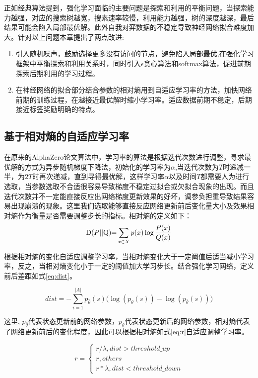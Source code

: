 正如经典算法提到，强化学习面临的主要问题是探索和利用的平衡问题，当探索能力越强，对应的搜索树越宽，搜素速率较慢，利用能力越强，树的深度越深，最后结果可能会陷入局部最优解。此外自我对弈数据的不稳定导致神经网络拟合难度加大。针对以上问题本章提出了两点改进:
\begin{enumerate}
\item 引入随机噪声，鼓励选择更多没有访问的节点，避免陷入局部最优,在强化学习框架中平衡探索和利用关系时，同时引入$\epsilon$贪心算法和softmax算法，促进前期探索后期利用的学习过程。
\item 在神经网络的拟合部分结合参数的相对熵用到自适应学习率的方法，加快网络前期的训练过程，在越接近最优解时缩小学习率。适应数据前期不稳定，后期接近标签奖励明确的特点。
\end{enumerate}



\subsection{基于相对熵的自适应学习率}
在原来的AlphaZero论文算法中，学习率的算法是根据迭代次数进行调整，寻求最优解的方式为异步随机梯度下降法，初始化的学习率为$\alpha$,当迭代次数为$T$时递减一半，为$2T$时再次递减，直到寻得最优解，这样学习率$\alpha$以及时间$T$都需要人为进行选取，当参数选取不合适很容易导致梯度不稳定过拟合或欠拟合现象的出现。而且迭代次数并不一定能直接反应出网络梯度更新效果的好坏，调参负担重导致结果容易出现崩溃的现象。这里我们选取能够直接反应网络更新前后变化量大小及效果相对熵作为衡量是否需要调整步长的指标。相对熵的定义如下：
\begin{equation}
{\rm{D}}(P{\rm{||Q}}){\rm{ = }}\sum\limits_{x \in X} {p(x)\log \frac{{P(x)}}{{Q(x)}}} 
\end{equation}

根据相对熵的变化自适应调整学习率，当相对熵变化大于一定阈值后适当减小学习率，反之，当相对熵变化小于一定的阈值加大学习步长。结合强化学习网络，定义前后差距如式\ref{eq:dist}。

\begin{equation}
\label{eq:dist}
dist =  - \sum\limits_{i = 1}^{|A|} {{p_{\bar \theta }}(s)(\log ({p_\theta }(s)) - \log ({p_{\bar \theta }}(s))} )
\end{equation}

这里, $p_{\bar \theta}$代表状态更新前的网络参数，$p_\theta $代表状态更新后的网络参数，相对熵代表了网络更新前后的变化程度，因此可以根据相对熵如式\ref{eq:r}自适应调整学习率。

\begin{equation}
\label{eq:r}
r = \left\{ {\begin{array}{*{20}{c}}
	{r/\lambda ,dist > threshold\_up}\\
	{r,others}\\
	{r*\lambda ,dist < threshold\_down}
	\end{array}} \right.
\end{equation}

